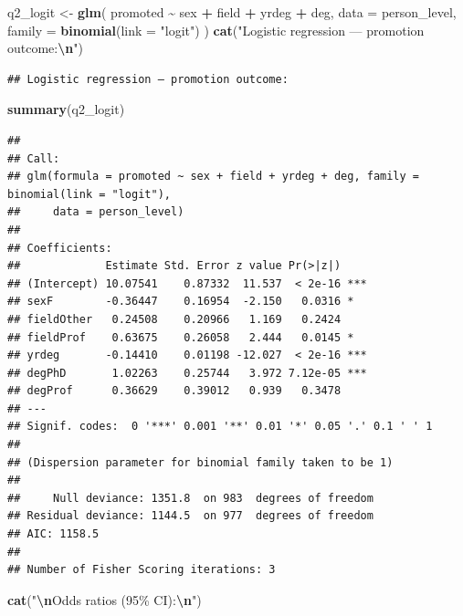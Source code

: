 \documentclass[
]{article}
\newenvironment{Shaded}{\begin{snugshade}}{\end{snugshade}}
\newcommand{\AttributeTok}[1]{\textcolor[rgb]{0.13,0.29,0.53}{#1}}
\newcommand{\FunctionTok}[1]{\textcolor[rgb]{0.13,0.29,0.53}{\textbf{#1}}}
\newcommand{\NormalTok}[1]{#1}
\newcommand{\OtherTok}[1]{\textcolor[rgb]{0.56,0.35,0.01}{#1}}
\newcommand{\SpecialCharTok}[1]{\textcolor[rgb]{0.81,0.36,0.00}{\textbf{#1}}}
\newcommand{\StringTok}[1]{\textcolor[rgb]{0.31,0.60,0.02}{#1}}
\begin{document}
\begin{Shaded}
\begin{Highlighting}[]
\NormalTok{q2\_logit }\OtherTok{\textless{}{-}} \FunctionTok{glm}\NormalTok{(}
\NormalTok{  promoted }\SpecialCharTok{\textasciitilde{}}\NormalTok{ sex }\SpecialCharTok{+}\NormalTok{ field }\SpecialCharTok{+}\NormalTok{ yrdeg }\SpecialCharTok{+}\NormalTok{ deg,}
  \AttributeTok{data   =}\NormalTok{ person\_level,}
  \AttributeTok{family =} \FunctionTok{binomial}\NormalTok{(}\AttributeTok{link =} \StringTok{"logit"}\NormalTok{)}
\NormalTok{)}
\FunctionTok{cat}\NormalTok{(}\StringTok{"Logistic regression — promotion outcome:}\SpecialCharTok{\textbackslash{}n}\StringTok{"}\NormalTok{)}
\end{Highlighting}
\end{Shaded}

\begin{verbatim}
## Logistic regression — promotion outcome:
\end{verbatim}

\begin{Shaded}
\begin{Highlighting}[]
\FunctionTok{summary}\NormalTok{(q2\_logit)}
\end{Highlighting}
\end{Shaded}

\begin{verbatim}
## 
## Call:
## glm(formula = promoted ~ sex + field + yrdeg + deg, family = binomial(link = "logit"), 
##     data = person_level)
## 
## Coefficients:
##             Estimate Std. Error z value Pr(>|z|)    
## (Intercept) 10.07541    0.87332  11.537  < 2e-16 ***
## sexF        -0.36447    0.16954  -2.150   0.0316 *  
## fieldOther   0.24508    0.20966   1.169   0.2424    
## fieldProf    0.63675    0.26058   2.444   0.0145 *  
## yrdeg       -0.14410    0.01198 -12.027  < 2e-16 ***
## degPhD       1.02263    0.25744   3.972 7.12e-05 ***
## degProf      0.36629    0.39012   0.939   0.3478    
## ---
## Signif. codes:  0 '***' 0.001 '**' 0.01 '*' 0.05 '.' 0.1 ' ' 1
## 
## (Dispersion parameter for binomial family taken to be 1)
## 
##     Null deviance: 1351.8  on 983  degrees of freedom
## Residual deviance: 1144.5  on 977  degrees of freedom
## AIC: 1158.5
## 
## Number of Fisher Scoring iterations: 3
\end{verbatim}

\begin{Shaded}
\begin{Highlighting}[]
\FunctionTok{cat}\NormalTok{(}\StringTok{"}\SpecialCharTok{\textbackslash{}n}\StringTok{Odds ratios (95\% CI):}\SpecialCharTok{\textbackslash{}n}\StringTok{"}\NormalTok{)}
\end{Highlighting}
\end{Shaded}
\end{document}
